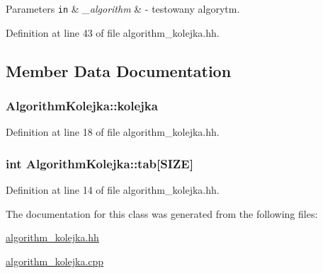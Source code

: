 \begin{DoxyParams}[1]{Parameters}
\mbox{\tt in}  & {\em \+\_\+algorithm} & -\/ testowany algorytm. \\
\hline
\end{DoxyParams}


Definition at line 43 of file algorithm\+\_\+kolejka.\+hh.



\subsection{Member Data Documentation}
\hypertarget{class_algorithm_kolejka_a49a2b654776c15b98475ce3a7491c3ed}{}
\subsubsection[{kolejka}]{ Algorithm\+Kolejka\+::kolejka\hspace{0.3cm}{\ttfamily [private]}}\label{class_algorithm_kolejka_a49a2b654776c15b98475ce3a7491c3ed}


Definition at line 18 of file algorithm\+\_\+kolejka.\+hh.

\hypertarget{class_algorithm_kolejka_a12512e397f0f154464dc42fb060fdd3e}{}
\subsubsection[{tab}]{\setlength{\rightskip}{0pt plus 5cm}int Algorithm\+Kolejka\+::tab\mbox{[}{\bf S\+I\+Z\+E}\mbox{]}\hspace{0.3cm}{\ttfamily [private]}}\label{class_algorithm_kolejka_a12512e397f0f154464dc42fb060fdd3e}


Definition at line 14 of file algorithm\+\_\+kolejka.\+hh.



The documentation for this class was generated from the following files\+:\begin{DoxyCompactItemize}
\item 
\hyperlink{algorithm__kolejka_8hh}{algorithm\+\_\+kolejka.\+hh}\item 
\hyperlink{algorithm__kolejka_8cpp}{algorithm\+\_\+kolejka.\+cpp}\end{DoxyCompactItemize}
